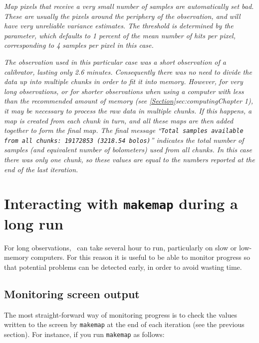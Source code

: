 \begin{terminalv}
\emph{Map pixels that receive a very small number of samples are automatically
set bad. These are usually the pixels around the periphery of the
observation, and will have very unreliable variance estimates. The
threshold is determined by the  parameter,
which defaults to 1 percent of the mean number of hits per pixel,
corresponding to 4 samples per pixel in this case.}

\emph{The observation used in this particular case was a short
observation of a calibrator, lasting only 2.6 minutes. Consequently there
was no need to divide the data up into multiple chunks in order to fit it
into memory.  However, for very long observations, or for shorter
observations when using a computer with less than the recommended amount
of memory (see \cref{Section}{sec:computing}{Chapter 1}), it may be
necessary to process the raw data in multiple chunks. If this happens, a
map is created from each chunk in turn, and all these maps are then added
together to form the final map.  The final message ``\texttt{Total
samples available from all chunks: 19172853 (3218.54 bolos)}'' indicates
the total number of samples (and equivalent number of bolometers) used
from all chunks. In this case there was only one chunk, so these values
are equal to the numbers reported at the end of the last iteration.}

\section{Interacting with \texttt{makemap} during a long run}
For long observations, \makemap\ can take several hour to run,
particularly on slow or low-memory computers. For this reason it is
useful to be able to monitor progress so that potential problems can be
detected early, in order to avoid wasting time.

\subsection{Monitoring screen output}
The most straight-forward way of monitoring progress is to check the
values written to the screen by \texttt{makemap} at the end of each iteration (see
the previous section). For instance, if you run \texttt{makemap} as follows:

\begin{terminalv}
\end{terminalv}


\end{terminalv}
